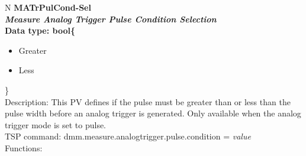 \documentclass[openany]{article}
\begin{document}
		\begin{tabular}{N}
			\hline
			\bfseries MATrPulCond-Sel\label{pv:matrpulcond-sel} \\ \hline
			\emph{Measure Analog Trigger Pulse Condition Selection} \\
			Data type: bool\{\begin{itemize}[noitemsep]
				\small
				\item[] Greater
				\item[] Less
			\end{itemize}\} \\
			Description: This PV defines if the pulse must be greater than or less than the pulse width before an analog trigger is generated. Only available when the analog trigger mode is set to pulse. \\
			TSP command: dmm.measure.analogtrigger.pulse.condition = \emph{value} \\
			Functions: \\
			\arrayrulecolor{\FuncTableBorderColor}

		\end{tabular}
\end{document}
